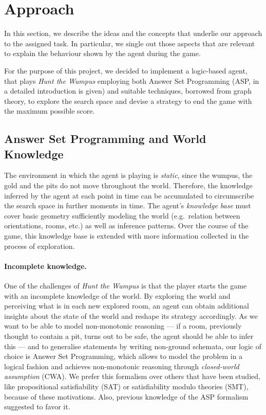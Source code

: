 \documentclass{llncs}
\newcommand{\htw}{\emph{Hunt the Wumpus}\xspace}
\begin{document}
\section{Approach}

In this section, we describe the ideas and the concepts that underlie our approach to the assigned task.
In particular, we single out those aspects that are relevant to explain the behaviour shown by the agent during the game.

For the purpose of this project, we decided to implement a logic-based agent, that plays \htw employing both Answer Set Programming (ASP, in~\cite{ASPprimer} a detailed introduction is given) and suitable techniques, borrowed from graph theory, to explore the search space and devise a strategy to end the game with the maximum possible score.

\subsection{Answer Set Programming and World Knowledge}

The environment in which the agent is playing is \emph{static}, since the wumpus, the gold and the pits do not move throughout the world.
Therefore, the knowledge inferred by the agent at each point in time can be accumulated to circumscribe the search space in further moments in time.
The agent's \emph{knowledge base} must cover basic geometry sufficiently modeling the world (e.g.\ relation between orientations, rooms, etc.) as well as inference patterns. Over the course of the game, this knowledge base is extended with more information collected in the process of exploration.

\paragraph{Incomplete knowledge.} One of the challenges of \htw is that the player starts the game with an incomplete knowledge of the world.
By exploring the world and perceiving what is in each new explored room, an agent can obtain additional insights about the state of the world and reshape its strategy accordingly.
As we want to be able to model non-monotonic reasoning --- if a room, previously thought to contain a pit, turns out to be safe, the agent should be able to infer this --- and to generalise statements by writing non-ground schemata, our logic of choice is Answer Set Programming, which allows to model the problem in a logical fashion and achieves non-monotonic reasoning through \emph{closed-world assumption} (CWA).
We prefer this formalism over others that have been studied, like propositional satisfiability (SAT) or satisfiability modulo theories (SMT), because of these motivations. Also, previous knowledge of the ASP formalism suggested to favor it.
\end{document}
